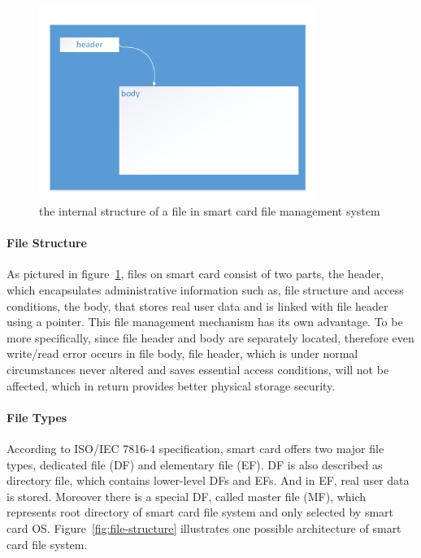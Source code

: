 \documentclass[]{llncs}
\begin{document}
\begin{figure}[!htbp]
	\centering
	\includegraphics[width=0.8\textwidth]{file}
		\caption[ ]{the internal structure of a file in smart card file management system\cite{handbuch}}
	\label{fig:file}
\end{figure}

\paragraph{File Structure}
As pictured in figure~\ref{fig:file}, files on smart card consist of two parts,  the header, which encapsulates administrative information such as, file structure and access conditions, the body, that stores real user data and is linked with file header using a pointer. This file management mechanism has its own advantage. To be more specifically, since file header and body are separately located, therefore even write/read error occurs in file body, file header, which is under normal circumstances never altered and saves essential access conditions, will not be affected, which in return provides better physical storage security.

\paragraph{File Types}
According to ISO/IEC 7816-4 specification, smart card offers two major file types, dedicated file (DF) and elementary file (EF). DF is also described as directory file, which contains lower-level DFs and EFs. And in EF, real user data is stored. Moreover there is a special DF, called master file (MF), which represents root directory of smart card file system and only selected by smart card OS. Figure~\ref{fig:file-structure} illustrates one possible architecture of smart card file system.
\end{document}
